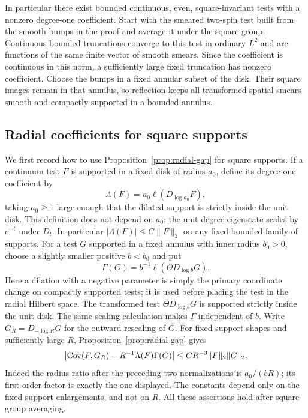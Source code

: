 In particular there exist bounded continuous, even, square-invariant
tests with a nonzero degree-one coefficient.  Start with the smeared
two-spin test built from the smooth bumps in the proof and average it
under the square group.  Continuous bounded truncations converge to
this test in ordinary $L^2$ and are functions of the same finite vector
of smooth smears.  Since the coefficient is continuous in this norm,
a sufficiently large fixed truncation has nonzero coefficient.
Choose the bumps in a fixed annular subset of the disk.  Their square
images remain in that annulus, so reflection keeps all transformed
spatial smears smooth and compactly supported in a bounded annulus.

\subsection{Radial coefficients for square supports}

We first record how to use Proposition~\ref{prop:radial-gap} for square
supports.  If a continuum test $F$ is supported in a fixed disk of
radius $a_0$, define its degree-one coefficient by
\[
 \Lambda(F)=a_0\ell(D_{\log a_0}F),
\]
taking $a_0\geq1$ large enough that the dilated support is strictly
inside the unit disk.  This definition does not depend on $a_0$:
the unit degree eigenstate scales by $e^{-t}$ under $D_t$.
In particular $|\Lambda(F)|\leq C\|F\|_2$ on any fixed bounded
family of supports.  For a test $G$ supported in a fixed annulus with
inner radius $b_0>0$, choose a slightly smaller positive $b<b_0$ and
put
\[
 \Gamma(G)=b^{-1}\ell(\Theta D_{\log b}G).
\]
Here a dilation with a negative parameter is simply the primary
coordinate change on compactly supported tests; it is used before
placing the test in the radial Hilbert space.  The transformed test
$\Theta D_{\log b}G$ is supported strictly inside the unit disk.
The same scaling calculation makes $\Gamma$ independent of $b$.
Write $G_R=D_{-\log R}G$ for the outward rescaling of $G$.
For fixed support shapes and sufficiently large $R$,
Proposition~\ref{prop:radial-gap} gives
\begin{equation}
 \left|\operatorname{Cov}(F,G_R)-R^{-1}\Lambda(F)\Gamma(G)\right|
 \leq C R^{-3}\|F\|_2\|G\|_2.
 \label{eq:transfer-general-radial}
\end{equation}
Indeed the radius ratio after the preceding two normalizations is
$a_0/(bR)$; its first-order factor is exactly the one displayed.
The constants depend only on the fixed support enlargements, and not
on $R$.  All these assertions hold after square-group averaging.

